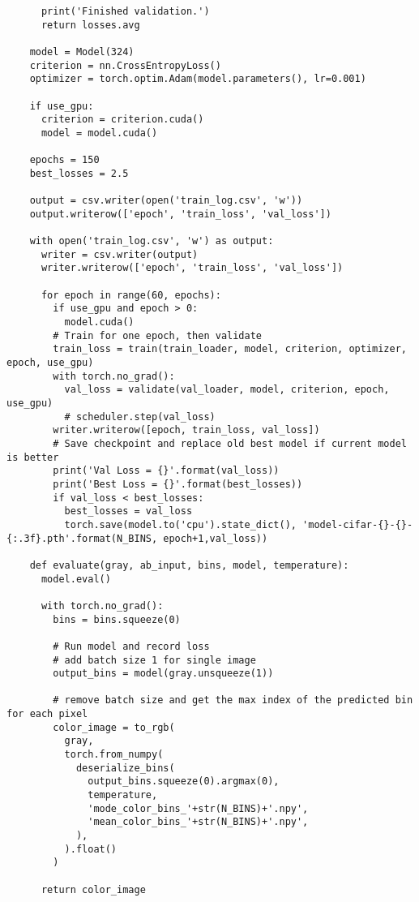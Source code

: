 \begin{longlisting}
\begin{verbatim}
      print('Finished validation.')
      return losses.avg

    model = Model(324)
    criterion = nn.CrossEntropyLoss()
    optimizer = torch.optim.Adam(model.parameters(), lr=0.001)

    if use_gpu:
      criterion = criterion.cuda()
      model = model.cuda()

    epochs = 150
    best_losses = 2.5

    output = csv.writer(open('train_log.csv', 'w'))
    output.writerow(['epoch', 'train_loss', 'val_loss'])

    with open('train_log.csv', 'w') as output:
      writer = csv.writer(output)
      writer.writerow(['epoch', 'train_loss', 'val_loss'])

      for epoch in range(60, epochs):
        if use_gpu and epoch > 0:
          model.cuda()
        # Train for one epoch, then validate
        train_loss = train(train_loader, model, criterion, optimizer, epoch, use_gpu)
        with torch.no_grad():
          val_loss = validate(val_loader, model, criterion, epoch, use_gpu)
          # scheduler.step(val_loss)
        writer.writerow([epoch, train_loss, val_loss])
        # Save checkpoint and replace old best model if current model is better
        print('Val Loss = {}'.format(val_loss))
        print('Best Loss = {}'.format(best_losses))
        if val_loss < best_losses:
          best_losses = val_loss
          torch.save(model.to('cpu').state_dict(), 'model-cifar-{}-{}-{:.3f}.pth'.format(N_BINS, epoch+1,val_loss))

    def evaluate(gray, ab_input, bins, model, temperature):
      model.eval()

      with torch.no_grad():
        bins = bins.squeeze(0)

        # Run model and record loss
        # add batch size 1 for single image
        output_bins = model(gray.unsqueeze(1))
        
        # remove batch size and get the max index of the predicted bin for each pixel
        color_image = to_rgb(
          gray,
          torch.from_numpy(
            deserialize_bins(
              output_bins.squeeze(0).argmax(0),
              temperature,
              'mode_color_bins_'+str(N_BINS)+'.npy',
              'mean_color_bins_'+str(N_BINS)+'.npy',
            ),
          ).float()
        )

      return color_image
  \end{verbatim}
\end{longlisting}